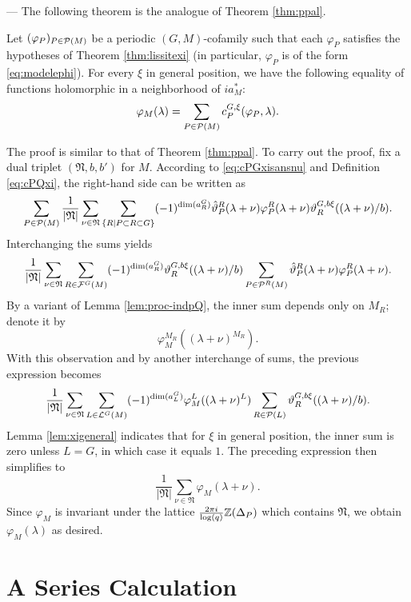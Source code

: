 \begin{paragr} --- The following theorem is the analogue of Theorem \ref{thm:ppal}.
  
\begin{theoreme}\label{thm:ppalper}
    Let $(\varphi_P)_{P\in \mathcal{P}(M)}$ be a periodic $(G,M)$-cofamily such that each $\varphi_P$ satisfies the hypotheses of Theorem \ref{thm:lissitexi} (in particular, $\varphi_P$ is of the form \eqref{eq:modelephi}). For every $\xi$ in general position, we have the following equality of functions holomorphic in a neighborhood of $ia_M^*$:
$$\varphi_M(\lambda)=\sum_{P\in \mathcal{P}(M)} c_{P}^{G,\xi}(\varphi_P,\lambda).$$
\end{theoreme}

\begin{preuve}
The proof is similar to that of Theorem \ref{thm:ppal}. To carry out the proof, fix a dual triplet $(\mathfrak{N},b,b')$ for $M$. According to \eqref{eq:cPGxisansnu} and Definition \eqref{eq:cPQxi}, the right-hand side can be written as
$$    \sum_{P\in \mathcal{P}(M)} \frac{1}{|\mathfrak{N}|}\sum_{\nu\in \mathfrak{N}} \sum_{\{R\mid P\subset R\subset G \}} (-1)^{\dim(a_R^G)} \hat{\vartheta}_P^R(\lambda+\nu) \varphi^R_P(\lambda+\nu) \vartheta_R^{G,b \xi}((\lambda+\nu)/b).$$
Interchanging the sums yields 
$$ \frac{1}{|\mathfrak{N}|}\sum_{\nu\in \mathfrak{N}} \sum_{R\in \mathcal{F}^G(M)} (-1)^{\dim(a_R^G)}\vartheta_R^{G,b \xi}((\lambda+\nu)/b)  \sum_{P\in \mathcal{P}^R(M)}  \hat{\vartheta}_P^R(\lambda+\nu) \varphi^R_P(\lambda+\nu).$$
By a variant of Lemma \ref{lem:proc-indpQ}, the inner sum depends only on $M_R$; denote it by  
$$\varphi_M^{M_R}((\lambda+\nu)^{M_R}).$$
With this observation and by another interchange of sums, the previous expression becomes
$$\frac{1}{|\mathfrak{N}|}\sum_{\nu\in \mathfrak{N}} \sum_{L\in \mathcal{L}^G(M)} (-1)^{\dim(a_L^G)}\varphi_{M}^{L}((\lambda+\nu)^L)\sum_{R\in \mathcal{P}(L)} \vartheta_R^{G,b \xi}((\lambda+\nu)/b).$$
Lemma \ref{lem:xigeneral} indicates that for $\xi$ in general position, the inner sum is zero unless $L=G$, in which case it equals $1$. The preceding expression then simplifies to 
$$\frac{1}{|\mathfrak{N}|}\sum_{\nu\in \mathfrak{N}}\varphi_{M}(\lambda+\nu).$$
Since $\varphi_M$ is invariant under the lattice $\frac{2\pi i}{\log(q)} \mathbb{Z}(\Delta_P)$ which contains $\mathfrak{N}$, we obtain $\varphi_{M}(\lambda)$ as desired.
\end{preuve}
\end{paragr}

\section{A Series Calculation}\label{sec:calculI}

